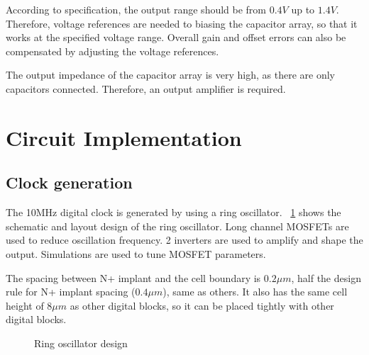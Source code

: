 \documentclass[journal]{IEEEtran}
\newcommand{\fref}[1]{\figurename~\ref{#1}}
\begin{document}
According to specification, the output range should be from $0.4 V$ up to $1.4 V$. Therefore, voltage references are needed to biasing the capacitor array, so that it works at the specified voltage range. Overall gain and offset errors can also be compensated by adjusting the voltage references.

The output impedance of the capacitor array is very high, as there are only capacitors connected. Therefore, an output amplifier is required.

\section{Circuit Implementation}

\subsection{Clock generation}

The 10MHz digital clock is generated by using a ring oscillator. \fref{fig_ringosc} shows the schematic and layout design of the ring oscillator. Long channel MOSFETs are used to reduce oscillation frequency. 2 inverters are used to amplify and shape the output. Simulations are used to tune MOSFET parameters.

The spacing between N+ implant and the cell boundary is $0.2 \mu m$, half the design rule for N+ implant spacing ($0.4 \mu m$), same as others. It also has the same cell height of $8 \mu m$ as other digital blocks, so it can be placed tightly with other digital blocks.

\begin{figure}[!t]
	\centering
	\hfil
	\caption{Ring oscillator design}
	\label{fig_ringosc}
\end{figure}
\end{document}
